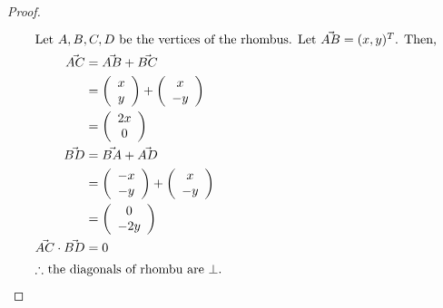 \documentclass[12pt]{article}
\newenvironment{problem}[2][Problem]{\begin{trivlist}
\item[\hskip \labelsep {\bfseries #1}\hskip \labelsep {\bfseries #2.}]}{\end{trivlist}}
\begin{document}
\begin{problem}{6}
\end{problem}
\begin{proof}
\begin{align*}
\intertext{Let $A, B, C, D$ be the vertices of the rhombus. Let $\vec{AB} = (x, y)^T$. Then,}
\vec{AC} &= \vec{AB} + \vec{BC} \\
&=
\left( \begin{array}{c}
	x\\
	y\\
\end{array} \right)
+
\left( \begin{array}{c}
	x\\
	-y\\
\end{array} \right) \\
&=
\left( \begin{array}{c}
	2x\\
	0\\
\end{array} \right) \\
\vec{BD} &= \vec{BA} + \vec{AD} \\
&=
\left( \begin{array}{c}
	-x\\
	-y\\
\end{array} \right)
+
\left( \begin{array}{c}
	x\\
	-y\\
\end{array} \right) \\
&=
\left( \begin{array}{c}
	0\\
	-2y\\
\end{array} \right) \\
\vec{AC} \cdot \vec{BD} &= 0\\
\intertext{$\therefore$ the diagonals of rhombu are $\bot$.}
\end{align*}
\end{proof}
\filbreak
\end{document}
